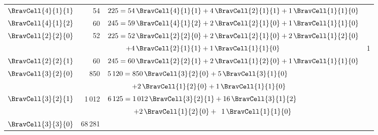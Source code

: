 \begin{table}
\begin{center}
{\begin{tabular}{lrlr}
$\BravCell{4}{1}{1}$&   54 & $225 =54\,\BravCell{4}{1}{1} %
			+{4}\,\BravCell{2}{1}{1}
                         + {1}\,\BravCell{1}{1}{0}$
                                                 &   \\
$\BravCell{4}{1}{2}$&   60 & $245 =59\,\BravCell{4}{1}{2} %
                         + {2}\,\BravCell{2}{1}{0}
                         + {1}\,\BravCell{1}{1}{0}$
                                                 &   \\
$\BravCell{2}{2}{0}$  &   52  & $225 =
               {52}\,\BravCell{2}{2}{0}
             + {2}\,\BravCell{2}{1}{0}
             + {2}\,\BravCell{1}{2}{0}$
                                                 &   \\
                      &       & $\quad\quad\;\;
             + {4}\,\BravCell{2}{1}{1}
             + {1}\,\BravCell{1}{1}{0}$
                                                 & 1 \\
$\BravCell{2}{2}{1}$&  60 & $245 = 60\,\BravCell{2}{2}{1}  %
			+ {2}\,\BravCell{1}{2}{0}
                         + {1}\,\BravCell{1}{1}{0}$
                                                 &   \\
$\BravCell{3}{2}{0}$  & 850  &
                          $ 5\,120 =850\,\BravCell{3}{2}{0}
                          +5\,\BravCell{3}{1}{0}$
                                                 &   \\
                      &       & $\qquad\quad\;\,
                          +2\,\BravCell{1}{2}{0}
                          +1\,\BravCell{1}{1}{0}$
                                                 &   \\
$\BravCell{3}{2}{1}$& 1\,012 &
                           $ 6\,125 =1\,012\,\BravCell{3}{2}{1} %
                           +16\,\BravCell{3}{1}{2}$
                                                 &   \\
                      &       & $\qquad\quad~~
                           +2\,\BravCell{1}{2}{0}
                           +~\,1\,\BravCell{1}{1}{0}$
                                                 &   \\
$\BravCell{3}{3}{0}$  & 68\,281 &


\end{tabular}}
\end{center}
\end{table}

